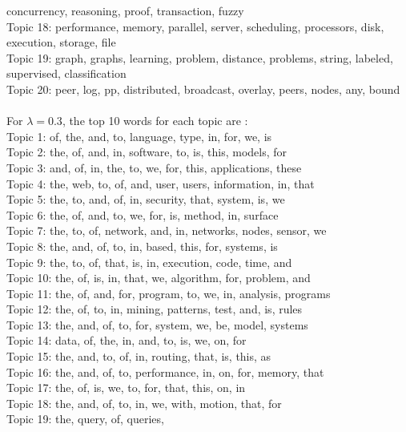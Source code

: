 concurrency,
reasoning,
proof,
transaction,
fuzzy
\\
Topic 18:
performance,
memory,
parallel,
server,
scheduling,
processors,
disk,
execution,
storage,
file
\\
Topic 19:
graph,
graphs,
learning,
problem,
distance,
problems,
string,
labeled,
supervised,
classification
\\
Topic 20:
peer,
log,
pp,
distributed,
broadcast,
overlay,
peers,
nodes,
any,
bound
\\ \\ 
For $\lambda = 0.3$, the top 10 words for each topic are : \\
Topic 1:
of,
the,
and,
to,
language,
type,
in,
for,
we,
is
\\
Topic 2:
the,
of,
and,
in,
software,
to,
is,
this,
models,
for
\\
Topic 3:
and,
of,
in,
the,
to,
we,
for,
this,
applications,
these
\\
Topic 4:
the,
web,
to,
of,
and,
user,
users,
information,
in,
that
\\
Topic 5:
the,
to,
and,
of,
in,
security,
that,
system,
is,
we
\\
Topic 6:
the,
of,
and,
to,
we,
for,
is,
method,
in,
surface
\\
Topic 7:
the,
to,
of,
network,
and,
in,
networks,
nodes,
sensor,
we
\\
Topic 8:
the,
and,
of,
to,
in,
based,
this,
for,
systems,
is
\\
Topic 9:
the,
to,
of,
that,
is,
in,
execution,
code,
time,
and
\\
Topic 10:
the,
of,
is,
in,
that,
we,
algorithm,
for,
problem,
and
\\
Topic 11:
the,
of,
and,
for,
program,
to,
we,
in,
analysis,
programs
\\
Topic 12:
the,
of,
to,
in,
mining,
patterns,
test,
and,
is,
rules
\\
Topic 13:
the,
and,
of,
to,
for,
system,
we,
be,
model,
systems
\\
Topic 14:
data,
of,
the,
in,
and,
to,
is,
we,
on,
for
\\
Topic 15:
the,
and,
to,
of,
in,
routing,
that,
is,
this,
as
\\
Topic 16:
the,
and,
of,
to,
performance,
in,
on,
for,
memory,
that
\\
Topic 17:
the,
of,
is,
we,
to,
for,
that,
this,
on,
in
\\
Topic 18:
the,
and,
of,
to,
in,
we,
with,
motion,
that,
for
\\
Topic 19:
the,
query,
of,
queries,
